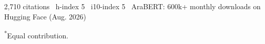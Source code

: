 
\vspace{2mm}
{\footnotesize\color{graytext}2,710 citations \textbullet\ h-index 5 \textbullet\ i10-index 5 \textbullet\ AraBERT: 600k+ monthly downloads on Hugging Face \quad (Aug. 2026)}
\vspace{1mm}

\begin{refsection}
    \nocite{baly2020arabert}
    \nocite{antoun2020aragpt2}
    \nocite{antoun2020araelectra}
    \nocite{antoun2020state}
    \nocite{djandji2020multi}
    \nocite{nassralla2016dynamic}
    
	
	\printbibliography[
	heading=none,
	sorting=none
	]
	\vspace{-2mm}
	{\footnotesize\color{graytext}\textsuperscript{*}Equal contribution.}
	\vspace{2mm}
\leavevmode\newline
\end{refsection}
